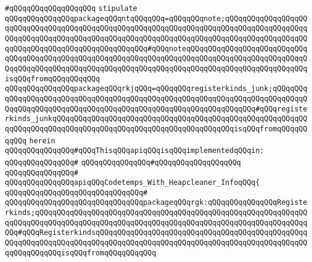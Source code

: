 \verb|#qQQqqQQqqQQqqQQqqQQq|\newline
\newline
\newline
\newline
\verb|stipulate|\newline
\verb|qQQqqQQqqQQqqQQqpackageqQQqntqQQqqQQq=qQQqqQQqnote;qQQqqQQqqQQqqQQqqQQqqQQqqQQqqQQqqQQqqQQqqQQqqQQqqQQqqQQqqQQqqQQqqQQqqQQqqQQqqQQqqQQqqQQqqQQqqQQqqQQqqQQqqQQqqQQqqQQqqQQqqQQqqQQqqQQqqQQqqQQqqQQqqQQqqQQqqQQqqQQqqQQqqQQqqQQqqQQqqQQqqQQqqQQqqQQq#qQQqnoteqQQqqQQqqQQqqQQqqQQqqQQqqQQqqQQqqQQqqQQqqQQqqQQqqQQqqQQqqQQqqQQqqQQqqQQqqQQqqQQqqQQqqQQqqQQqqQQqqQQqqQQqqQQqqQQqqQQqqQQqqQQqqQQqqQQqqQQqqQQqqQQqqQQqqQQqqQQqqQQqqQQqqQQqisqQQqfromqQQqqQQqqQQq|\newline
\verb|qQQqqQQqqQQqqQQqpackageqQQqrkjqQQq=qQQqqQQqregisterkinds_junk;qQQqqQQqqQQqqQQqqQQqqQQqqQQqqQQqqQQqqQQqqQQqqQQqqQQqqQQqqQQqqQQqqQQqqQQqqQQqqQQqqQQqqQQqqQQqqQQqqQQqqQQqqQQqqQQqqQQqqQQqqQQqqQQqqQQqqQQq#qQQqregisterkinds_junkqQQqqQQqqQQqqQQqqQQqqQQqqQQqqQQqqQQqqQQqqQQqqQQqqQQqqQQqqQQqqQQqqQQqqQQqqQQqqQQqqQQqqQQqqQQqqQQqqQQqqQQqqQQqqQQqisqQQqfromqQQqqQQqqQQq|\newline
\verb|herein|\newline
\newline
\verb|qQQqqQQqqQQqqQQq#qQQqThisqQQqapiqQQqisqQQqimplementedqQQqin:|\newline
\verb|qQQqqQQqqQQqqQQq#|\newline
\verb|qQQqqQQqqQQqqQQq#qQQqqQQqqQQqqQQqqQQq|\newline
\verb|qQQqqQQqqQQqqQQq#|\newline
\verb|qQQqqQQqqQQqqQQqapiqQQqCodetemps_With_Heapcleaner_InfoqQQq{|\newline
\verb|qQQqqQQqqQQqqQQqqQQqqQQqqQQqqQQq#|\newline
\verb|qQQqqQQqqQQqqQQqqQQqqQQqqQQqqQQqpackageqQQqrgk:qQQqqQQqqQQqqQQqRegisterkinds;qQQqqQQqqQQqqQQqqQQqqQQqqQQqqQQqqQQqqQQqqQQqqQQqqQQqqQQqqQQqqQQqqQQqqQQqqQQqqQQqqQQqqQQqqQQqqQQqqQQqqQQqqQQqqQQqqQQqqQQqqQQqqQQqqQQqqQQq#qQQqRegisterkindsqQQqqQQqqQQqqQQqqQQqqQQqqQQqqQQqqQQqqQQqqQQqqQQqqQQqqQQqqQQqqQQqqQQqqQQqqQQqqQQqqQQqqQQqqQQqqQQqqQQqqQQqqQQqqQQqqQQqqQQqqQQqqQQqqQQqisqQQqfromqQQqqQQqqQQq|\newline
